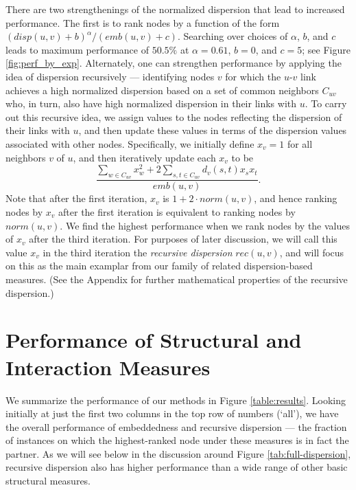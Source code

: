 \documentclass{sigchi}
\begin{document}
There are two strengthenings of the normalized dispersion that
lead to increased performance.
The first is to rank nodes by a function of the form
$(disp(u,v) + b)^\alpha / (emb(u,v) + c)$.
Searching over choices of $\alpha$, $b$, and $c$ leads to 
maximum performance of $50.5\%$ at $\alpha = 0.61$, $b = 0$, and $c = 5$;
see Figure \ref{fig:perf_by_exp}.
Alternately, one can strengthen performance by applying the idea of 
dispersion recursively --- identifying nodes $v$
for which the $u$-$v$ link achieves a high normalized dispersion based on
a set of common neighbors $C_{uv}$ who, in turn, also have
high normalized dispersion in their links with $u$.
To carry out this recursive idea, we assign values to the nodes
reflecting the dispersion of their links with $u$, and then update these values
in terms of the dispersion values associated with other nodes.
Specifically, we initially define $x_v = 1$ for all neighbors $v$ of $u$,
and then iteratively update each $x_v$ to be 
$$\frac{    \sum_{w \in C_{uv}} x_w^2 
        + 2 \sum_{s, t \in C_{uv}} d_v(s,t) x_s x_t}
       {emb(u,v)}.$$
Note that after the first iteration, $x_v$ is $1 + 2 \cdot norm(u,v)$,
and hence ranking nodes by $x_v$ after the first iteration is equivalent
to ranking nodes by $norm(u,v)$.
We find the highest performance when we rank nodes by the values of
$x_v$ after the third iteration. 
For purposes of later discussion, we will call this value $x_v$
in the third iteration the {\em recursive dispersion} $rec(u,v)$,
and will focus on this as the main examplar from our family
of related dispersion-based measures.
(See the Appendix for further mathematical properties of 
the recursive dispersion.)

\section{Performance of Structural and Interaction Measures}

We summarize the performance of our methods 
in Figure \ref{table:results}.
Looking initially at just the 
first two columns in the top row of numbers (`all'),
we have the overall performance of
embeddedness and recursive dispersion --- the fraction of instances
on which the highest-ranked node under these measures is in 
fact the partner.  
As we will see below in the discussion around 
Figure \ref{tab:full-dispersion},
recursive dispersion also has higher performance than
a wide range of other basic structural measures.
\end{document}
